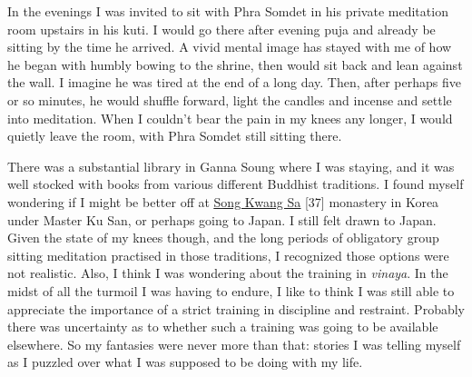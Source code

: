 In the evenings I was invited to sit with Phra Somdet in his private
meditation room upstairs in his kuti. I would go there after evening
puja and already be sitting by the time he arrived. A vivid mental image
has stayed with me of how he began with humbly bowing to the shrine,
then would sit back and lean against the wall. I imagine he was tired at
the end of a long day. Then, after perhaps five or so minutes, he would
shuffle forward, light the candles and incense and settle into
meditation. When I couldn't bear the pain in my knees any longer, I
would quietly leave the room, with Phra Somdet still sitting there.

There was a substantial library in Ganna Soung where I was staying, and
it was well stocked with books from various different Buddhist
traditions. I found myself wondering if I might be better off at
\href{https://en.wikipedia.org/wiki/Songgwangsa}{\underline{Song Kwang
Sa}} {[}37{]} monastery in Korea under Master Ku San, or perhaps going
to Japan. I still felt drawn to Japan. Given the state of my knees
though, and the long periods of obligatory group sitting meditation
practised in those traditions, I recognized those options were not
realistic. Also, I think I was wondering about the training in
\emph{vinaya}. In the midst of all the turmoil I was having to endure, I
like to think I was still able to appreciate the importance of a strict
training in discipline and restraint. Probably there was uncertainty as
to whether such a training was going to be available elsewhere. So my
fantasies were never more than that: stories I was telling myself as I
puzzled over what I was supposed to be doing with my life.

